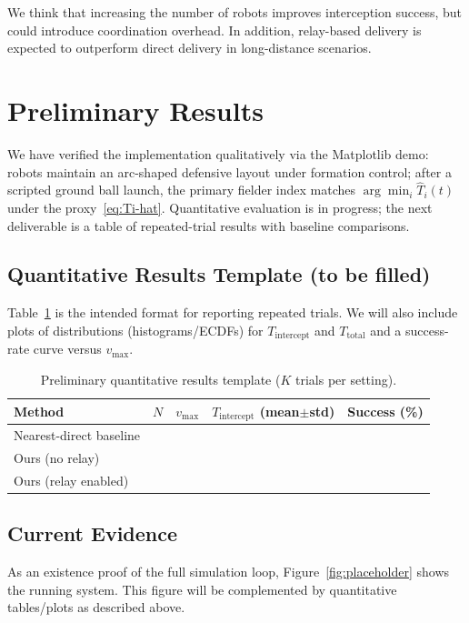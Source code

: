 \documentclass[conference]{IEEEtran}
\begin{document}
We think that increasing the number of robots improves interception success, but could introduce coordination overhead. In addition, relay-based delivery is expected to outperform direct delivery in long-distance scenarios.

\section{Preliminary Results}

We have verified the implementation qualitatively via the Matplotlib demo: robots maintain an arc-shaped defensive layout under formation control; after a scripted ground ball launch, the primary fielder index matches $\arg\min_i \widehat{T}_i(t)$ under the proxy~\eqref{eq:Ti-hat}. Quantitative evaluation is in progress; the next deliverable is a table of repeated-trial results with baseline comparisons.

\subsection{Quantitative Results Template (to be filled)}
Table~\ref{tab:results-template} is the intended format for reporting repeated trials. We will also include plots of distributions (histograms/ECDFs) for \(T_{\mathrm{intercept}}\) and \(T_{\mathrm{total}}\) and a success-rate curve versus \(v_{\max}\).

\begin{table}[htbp]
\centering
\caption{Preliminary quantitative results template (\(K\) trials per setting).}
\label{tab:results-template}
\begin{tabular}{@{}lcccc@{}}
\toprule
Method & \(N\) & \(v_{\max}\) & \(T_{\mathrm{intercept}}\) (mean\(\pm\)std) & Success (\%) \\
\midrule
Nearest-direct baseline &  &  &  &  \\
Ours (no relay) &  &  &  &  \\
Ours (relay enabled) &  &  &  &  \\
\bottomrule
\end{tabular}
\end{table}

\subsection{Current Evidence}
As an existence proof of the full simulation loop, Figure~\ref{fig:placeholder} shows the running system. This figure will be complemented by quantitative tables/plots as described above.
\end{document}
